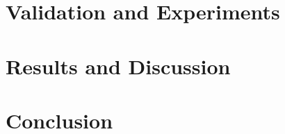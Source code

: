 \documentclass[runningheads,a4paper]{../../StyleFiles/llncs}
\begin{document}
\section{Validation and Experiments}

\section{Results and Discussion}


\section{Conclusion}



\end{document}
